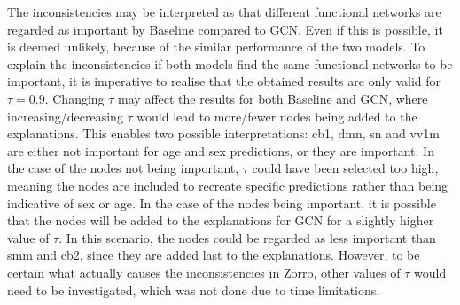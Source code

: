 
The inconsistencies may be interpreted as that different functional networks are regarded as important by Baseline compared to GCN. Even if this is possible, it is deemed unlikely, because of the similar performance of the two models. To explain the inconsistencies if both models find the same functional networks to be important, it is imperative to realise that the obtained results are only valid for $\tau = 0.9$. Changing $\tau$ may affect the results for both Baseline and GCN, where increasing/decreasing $\tau$ would lead to more/fewer nodes being added to the explanations. This enables two possible interpretations: \acrshort{cb1}, \acrshort{dmn}, \acrshort{sn} and \acrshort{vv1m} are either not important for age and sex predictions, or they are important. In the case of the nodes not being important, $\tau$ could have been selected too high, meaning the nodes are included to recreate specific predictions rather than being indicative of sex or age. In the case of the nodes being important, it is possible that the nodes will be added to the explanations for GCN for a slightly higher value of $\tau$. In this scenario, the nodes could be regarded as less important than \acrshort{smm} and \acrshort{cb2}, since they are added last to the explanations. However, to be certain what actually causes the inconsistencies in Zorro, other values of $\tau$ would need to be investigated, which was not done due to time limitations. 


